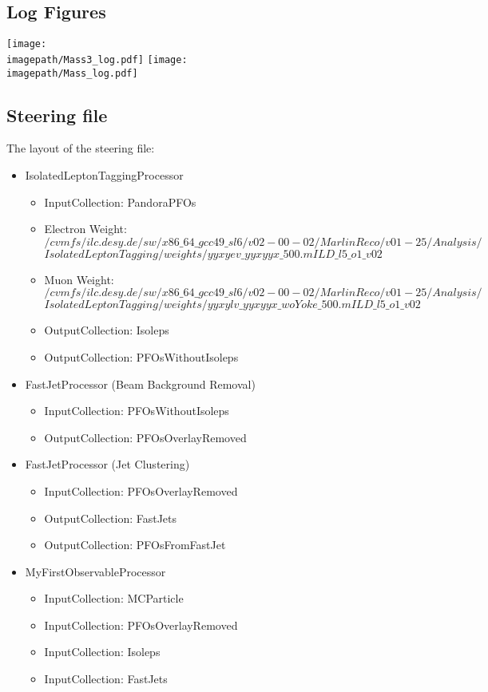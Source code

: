 \subsection{Log Figures}
\label{App:LogFigures}
\texttt{[image: \\imagepath/Mass3\_log.pdf]}
\texttt{[image: \\imagepath/Mass\_log.pdf]}

\subsection{Steering file}
\label{App:SteeringFile}

The layout of the steering file:

\begin{itemize}
	\item IsolatedLeptonTaggingProcessor
		\begin{itemize}
			\item InputCollection: PandoraPFOs
			\item Electron Weight:\\
            \texttt{$/cvmfs/ilc.desy.de/sw/x86\_64\_gcc49\_sl6/v02-00-02/MarlinReco/v01-25/Analysis/$}
            \texttt{$IsolatedLeptonTagging/weights/yyxyev\_yyxyyx\_500.mILD\_l5\_o1\_v02$}
			\item Muon Weight: \\
            \texttt{$/cvmfs/ilc.desy.de/sw/x86\_64\_gcc49\_sl6/v02-00-02/MarlinReco/v01-25/Analysis/$}
            \texttt{$IsolatedLeptonTagging/weights/yyxylv\_yyxyyx\_woYoke\_500.mILD\_l5\_o1\_v02$}
			\item OutputCollection: Isoleps
			\item OutputCollection: PFOsWithoutIsoleps
		\end{itemize}
	\item FastJetProcessor (Beam Background Removal)
		\begin{itemize}
			\item InputCollection: PFOsWithoutIsoleps
			\item OutputCollection: PFOsOverlayRemoved
		\end{itemize}
	\item FastJetProcessor (Jet Clustering)
		\begin{itemize}
			\item InputCollection: PFOsOverlayRemoved
			\item OutputCollection: FastJets
			\item OutputCollection: PFOsFromFastJet
		\end{itemize}
	\item MyFirstObservableProcessor
		\begin{itemize}
			\item InputCollection: MCParticle
			\item InputCollection: PFOsOverlayRemoved
			\item InputCollection: Isoleps
			\item InputCollection: FastJets
		\end{itemize}
\end{itemize}
